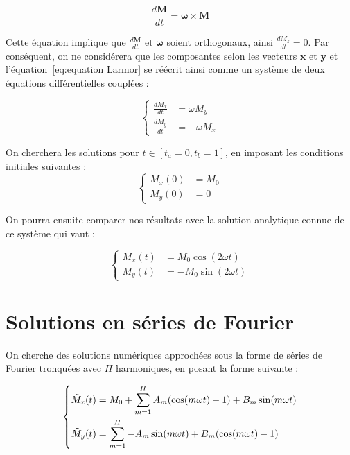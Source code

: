 \documentclass[12pt]{report}
\begin{document}
\begin{equation}
    \frac{d\bm{M}}{dt} = \bm{\omega}\times\bm{M} 
    \label{eq:equation Larmor}
\end{equation}

Cette équation implique que $\frac{d\bm{M}}{dt} $ et $\bm{\omega}$ soient orthogonaux, ainsi $\frac{dM_z}{dt}=0$. Par conséquent, on ne considérera que les composantes selon les vecteurs $\bm{x}$ et $\bm{y}$ et l'équation~\ref{eq:equation Larmor} se réécrit ainsi comme un système de deux équations différentielles couplées : 

\begin{equation}
\left\{
    \begin{aligned}
        \frac{dM_x}{dt} &= \omega M_y \\
        \frac{dM_y}{dt} &= -\omega M_x
    \end{aligned}
\right.
\end{equation}

On cherchera les solutions pour $t\in [t_a=0,t_b=1]$, en imposant les conditions initiales suivantes :
\begin{equation}
\left\{
    \begin{aligned}
        M_x(0) &= M_0 \\
        M_y(0) &= 0
    \end{aligned}
\right.
\label{eq:équations couplées}
\end{equation}

On pourra ensuite comparer nos résultats avec la solution analytique connue de ce système qui vaut :

\begin{equation}
\left\{
    \begin{aligned}
        M_x(t) &=  M_0 \cos(2\omega t)\\
        M_y(t) &= -M_0 \sin(2\omega t)
    \end{aligned}
\right.
\label{eq:solution analytique couplée}
\end{equation}

\section{Solutions en séries de Fourier}
On cherche des solutions numériques approchées sous la forme de séries de Fourier tronquées avec $H$ harmoniques, en posant la forme suivante :

\begin{equation}
\left\{
    \begin{aligned}
        \Tilde{M}_x(t) &= M_0 + \sum_{m=1}^{H} A_m (\cos(m\omega t)-1) + B_m \sin(m\omega t) \\
        \Tilde{M}_y(t) &= \sum_{m=1}^{H} -A_m \sin(m\omega t) + B_m (\cos(m\omega t)-1)
    \end{aligned}
\right.
\label{eq:solution Fourier couplée}
\end{equation}
\end{document}
